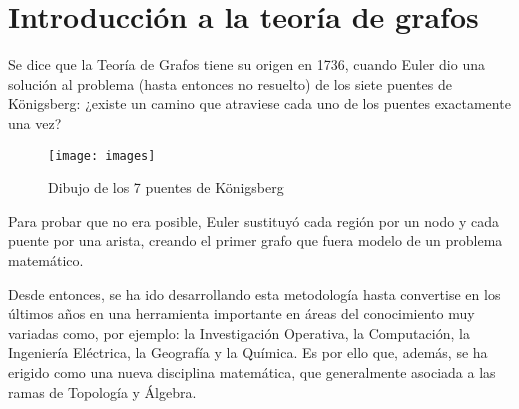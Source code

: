 \chapter{Introducción a la teoría de grafos}

Se dice que la Teoría de Grafos tiene su origen en 1736, cuando Euler dio una 
solución al problema (hasta entonces no resuelto) de los siete puentes de 
Königsberg: ¿existe un camino que atraviese cada uno de los puentes exactamente 
una vez?  

\begin{figure}[h]
\captionsetup{font=scriptsize}
\caption{Dibujo de los 7 puentes de Königsberg}
\centering
\texttt{[image: images]}
\end{figure}

Para probar que no era posible, Euler sustituyó cada región por un nodo y cada 
puente por una arista, creando el primer grafo que fuera modelo de un problema
matemático. 

\begin{center}
\end{center}

Desde entonces, se ha ido desarrollando esta metodología hasta 
convertise en los últimos años en una herramienta importante en áreas del 
conocimiento muy variadas como, por ejemplo: la Investigación Operativa, la 
Computación, la Ingeniería Eléctrica, la Geografía y la Química. Es por ello que, 
además, se ha erigido como una nueva disciplina matemática, que generalmente 
asociada a las ramas de Topología y Álgebra.

